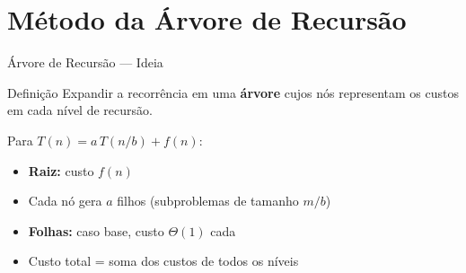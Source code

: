\documentclass[aspectratio=169]{beamer}
\newcommand{\impt}[1]{\textcolor{maccent}{\textbf{#1}}}
\begin{document}
\section{Método da Árvore de Recursão}

\begin{frame}{Árvore de Recursão --- Ideia}
\begin{block}{Definição}
Expandir a recorrência em uma \textbf{árvore} cujos nós representam os custos em cada nível de recursão.
\end{block}

\vspace{0.3cm}
\pause

Para $T(n) = a\,T(n/b) + f(n)$:
\begin{itemize}
    \item \impt{Raiz:} custo $f(n)$
    \item Cada nó gera $a$ filhos (subproblemas de tamanho $m/b$)
    \item \impt{Folhas:} caso base, custo $\Theta(1)$ cada
    \item Custo total = soma dos custos de todos os níveis
\end{itemize}
\end{frame}

\end{document}
